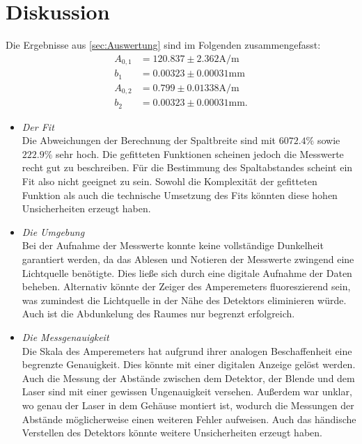 \section{Diskussion}
\label{sec:Diskussion}
Die Ergebnisse aus \ref{sec:Auswertung} sind im Folgenden zusammengefasst:
\begin{align*}
  A_{0,1} & = 120.837 \pm 2.362 \si{\ampere\per\meter}\\
  b_1     & = 0.00323 \pm 0.00031 \si{\milli\meter} \\
  A_{0,2} & =  0.799 \pm 0.01338 \si{\ampere\per\meter}\\
  b_2     & =  0.00323 \pm 0.00031 \si{\milli\meter}.
\end{align*}

\begin{itemize}
  \item \textit{Der Fit} \\
    Die Abweichungen der Berechnung der Spaltbreite sind mit $6072.4 \si{\percent}$
    sowie $222.9 \si{\percent}$ sehr hoch. Die gefitteten Funktionen scheinen jedoch
    die Messwerte recht gut zu beschreiben. Für die Bestimmung des Spaltabstandes
    scheint ein Fit also nicht geeignet zu sein. Sowohl die Komplexität der gefitteten
    Funktion als auch die technische Umsetzung des Fits könnten diese hohen
    Unsicherheiten erzeugt haben.

  \item \textit{Die Umgebung} \\
    Bei der Aufnahme der Messwerte konnte keine vollständige Dunkelheit garantiert
    werden, da das Ablesen und Notieren der Messwerte zwingend eine Lichtquelle
    benötigte. Dies ließe sich durch eine digitale Aufnahme der Daten beheben.
    Alternativ könnte der Zeiger des Amperemeters fluoreszierend sein, was zumindest
    die Lichtquelle in der Nähe des Detektors eliminieren würde. Auch ist die
    Abdunkelung des Raumes nur begrenzt erfolgreich.

  \item \textit{Die Messgenauigkeit} \\
    Die Skala des Amperemeters hat aufgrund ihrer analogen Beschaffenheit eine
    begrenzte Genauigkeit. Dies könnte mit einer digitalen Anzeige gelöst werden.
    Auch die Messung der Abstände zwischen dem Detektor, der Blende und dem Laser
    sind mit einer gewissen Ungenauigkeit versehen. Außerdem war unklar, wo genau
    der Laser in dem Gehäuse montiert ist, wodurch die Messungen der Abstände
    möglicherweise einen weiteren Fehler aufweisen. Auch das händische Verstellen
    des Detektors könnte weitere Unsicherheiten erzeugt haben.


\end{itemize}

